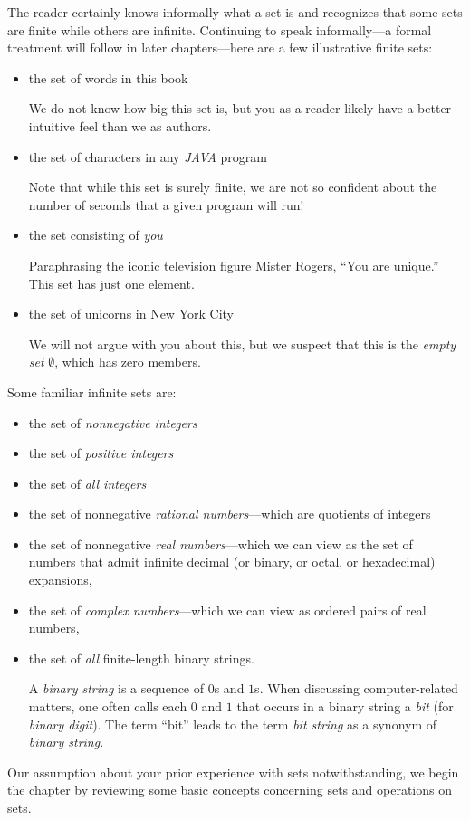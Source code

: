 The reader certainly knows informally what a set is and recognizes that some sets are finite while others are infinite.  Continuing to speak informally---a formal treatment will follow in later
chapters---here are a few illustrative finite sets:
\begin{itemize}
\item
the set of words in this book

\smallskip

We do not know how big this set is, but you as a reader likely have a better intuitive feel than we as authors.
\item
the set of characters in any {\it JAVA} program

\smallskip

Note that while this set is surely finite, we are not so confident about the number of seconds that a given program will run!
\item
the set consisting of {\em you}

\smallskip

Paraphrasing the iconic television figure Mister Rogers, ``You are unique.''  This set has just one element.
\item
the set of unicorns in New York City

\smallskip

We will not argue with you about this, but we suspect that this is the {\em empty set} $\emptyset$, which has zero members.
\end{itemize}
Some familiar infinite sets are:
\begin{itemize}
\item
the set of {\em nonnegative integers}
\item
the set of {\em positive integers}
\item
the set of {\em all integers}
\item
the set of nonnegative {\em rational numbers}---which are quotients of integers
\item
the set of nonnegative {\em real numbers}---which we can view as the set of numbers that admit infinite decimal (or binary, or octal, or hexadecimal) expansions,
\item
the set of {\em complex numbers}---which we can view as ordered pairs of real numbers,
\item
the set of {\em all} finite-length binary strings.

\smallskip

  
A {\it binary string} is a sequence of $0$s and $1$s.  When discussing computer-related matters, one often calls each $0$ and $1$ that occurs in a binary string a {\it bit} (for {\it binary digit}).  The term ``bit'' leads to the term {\it bit string} as a synonym of {\it binary string}.
\end{itemize}
Our assumption about your prior experience with sets notwithstanding, we begin the chapter by reviewing some basic concepts concerning sets and operations on sets.

